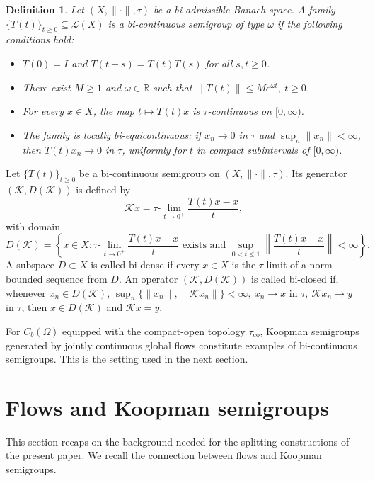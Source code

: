 \documentclass[preprint,1p,times,nopreprintline]{elsarticle}
\newtheorem{definition}[theorem]{Definition}
\begin{document}
\begin{definition}
\label{defBi}
Let $(X,\|\cdot\|,\tau)$ be a bi-admissible Banach space. A family $\{T(t)\}_{t\ge 0}\subseteq \mathcal{L}(X)$ is a bi-continuous semigroup of type $\omega$ if the following conditions hold:
\begin{itemize}
\item $T(0)=I$ and $T(t+s)=T(t)T(s)$ for all $s,t\ge 0$.
\item There exist $M\ge 1$ and $\omega\in\mathbb{R}$ such that $\|T(t)\|\le M e^{\omega t},~t\ge 0$.
\item For every $x\in X$, the map $t\mapsto T(t)x$ is $\tau$-continuous on $[0,\infty)$.
\item The family is locally bi-equicontinuous: if $x_n\to 0$ in $\tau$ and $\sup_n\|x_n\|<\infty$, then $T(t)x_n\to 0$ in $\tau$, uniformly for $t$ in compact subintervals of $[0,\infty)$.
\end{itemize}
\end{definition}

Let $\{T(t)\}_{t\ge 0}$ be a bi-continuous semigroup on $(X,\|\cdot\|,\tau)$. Its generator $(\mathcal{K},D(\mathcal{K}))$ is defined by
\[
\mathcal{K}x
=
\tau\text{-}\lim_{t\to 0^+}\frac{T(t)x-x}{t},
\]
with domain
\[
D(\mathcal{K})
=
\left\{
x\in X:
\tau\text{-}\lim_{t\to 0^+}\frac{T(t)x-x}{t}
\text{ exists and }
\sup_{0<t\le 1}
\left\|
\frac{T(t)x-x}{t}
\right\|
<\infty
\right\}.
\]
A subspace $D\subset X$ is called bi-dense if every $x\in X$ is the $\tau$-limit of a norm-bounded sequence from $D$. An operator $(\mathcal{K},D(\mathcal{K}))$ is called bi-closed if, whenever $x_n\in D(\mathcal{K})$, $\sup_n\{\|x_n\|,\|\mathcal{K}x_n\|\}<\infty,~x_n\to x$ in $\tau,~\mathcal{K}x_n\to y$ in $\tau$, then $x\in D(\mathcal{K})$ and $\mathcal{K}x=y$.

For $C_b(\Omega)$ equipped with the compact-open topology $\tau_{\mathrm{co}}$, Koopman semigroups generated by jointly continuous global flows constitute examples of bi-continuous semigroups. This is the setting used in the next section.

\section{Flows and Koopman semigroups}
\label{sec:flow}

This section recaps on the background needed for the splitting constructions of the present paper. We recall the connection between flows and Koopman semigroups.
\end{document}
